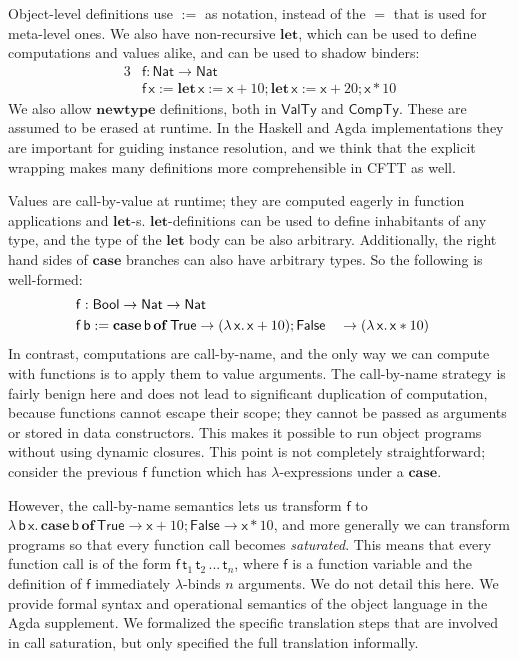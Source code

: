 \documentclass[acmsmall,screen]{acmart}
\newcommand{\msf}[1]{{\mathsf{#1}}}
\newcommand{\mbf}[1]{{\mathbf{#1}}}
\newcommand{\lam}{\lambda\,}
\newcommand{\of}{\mbf{of}\,}
\newcommand{\letdef}{\mbf{let\,}}
\newcommand{\vb}{\mathsf{b}}
\newcommand{\vx}{\mathsf{x}}
\newcommand{\vf}{\mathsf{f}}
\newcommand{\vt}{\mathsf{t}}
\newcommand{\Bool}{\msf{Bool}}
\newcommand{\case}{\mbf{case\,}}
\newcommand{\VTy}{\msf{ValTy}}
\newcommand{\CTy}{\msf{CompTy}}
\newcommand{\True}{\msf{True}}
\newcommand{\False}{\msf{False}}
\newcommand{\Nat}{\msf{Nat}}
\theoremstyle{remark}
\begin{document}
Object-level definitions use $:=$ as notation, instead of the $=$ that is used
for meta-level ones. We also have non-recursive $\mbf{let}$, which can be used
to define computations and values alike, and can be used to shadow binders:
\begin{alignat*}{3}
  &\vf : \Nat \to \Nat\\
  &\vf\,\vx := \letdef \vx := \vx + 10; \letdef \vx := \vx + 20; \vx * 10
\end{alignat*}
We also allow $\mbf{newtype}$ definitions, both in $\VTy$ and $\CTy$. These are
assumed to be erased at runtime. In the Haskell and Agda implementations they
are important for guiding instance resolution, and we think that the explicit
wrapping makes many definitions more comprehensible in CFTT as well.

Values are call-by-value at runtime; they are computed eagerly in function
applications and $\mbf{let}$-s. $\mbf{let}$-definitions can be used to define
inhabitants of any type, and the type of the $\mbf{let}$ body can be also
arbitrary. Additionally, the right hand sides of $\mbf{case}$ branches can also
have arbitrary types. So the following is well-formed:
\begin{alignat*}{3}
  &\vf : \mathrlap{\Bool \to \Nat \to \Nat}\\
  &\vf\,\vb := \case \vb\,\of \True \to (\lam \vx.\, \vx + 10); \False &&\to (\lam \vx.\, \vx * 10)
\end{alignat*}
In contrast, computations are call-by-name, and the only way we can compute with
functions is to apply them to value arguments. The call-by-name strategy is
fairly benign here and does not lead to significant duplication of computation,
because functions cannot escape their scope; they cannot be passed as arguments
or stored in data constructors. This makes it possible to run object programs
without using dynamic closures. This point is not completely straightforward;
consider the previous $\vf$ function which has $\lambda$-expressions under a
$\mbf{case}$.

However, the call-by-name semantics lets us transform $\vf$ to $\lam
\vb\,\vx.\,\case \vb\,\of \True \to \vx + 10; \False \to \vx * 10$, and more
generally we can transform programs so that every function call becomes
\emph{saturated}. This means that every function call is of the form
$\vf\,\vt_1\,\vt_2\,...\,\vt_n$, where $\vf$ is a function variable and the
definition of $\vf$ immediately $\lambda$-binds $n$ arguments. We do not detail
this here. We provide formal syntax and operational semantics of the object
language in the Agda supplement. We formalized the specific translation steps
that are involved in call saturation, but only specified the full translation
informally.
\end{document}
